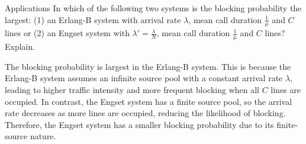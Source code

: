 \begin{problem}{Applications}
   In which of the following two systems is the blocking probability the largest: (1) an Erlang-B system with arrival rate $\lambda$, mean call duration $\frac{1}{\mu}$ and $C$ lines or (2) an Engset system with $\lambda' = \frac{\lambda}{N}$, mean call duration $\frac{1}{\mu}$ and $C$ lines? Explain.
\end{problem}

\begin{solution}
    The blocking probability is largest in the Erlang-B system. This is because the Erlang-B system assumes an infinite source pool with a constant arrival rate $\lambda$, leading to higher traffic intensity and more frequent blocking when all $C$ lines are occupied. In contrast, the Engset system has a finite source pool, so the arrival rate decreases as more lines are occupied, reducing the likelihood of blocking. Therefore, the Engset system has a smaller blocking probability due to its finite-source nature.
\end{solution}
